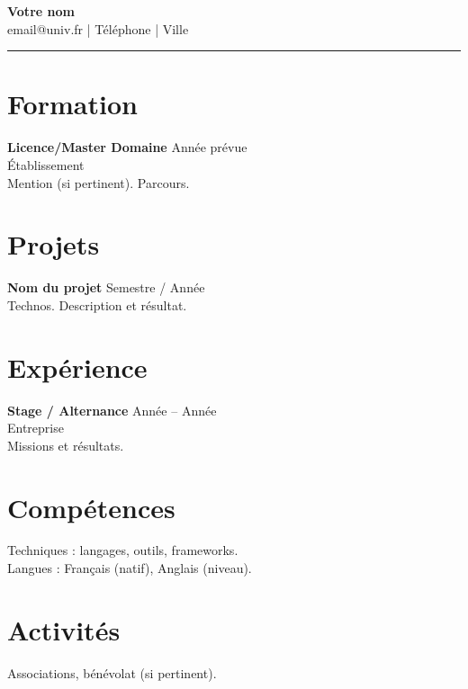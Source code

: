 \documentclass[11pt,a4paper]{article}
\begin{document}
\begin{center}
{\LARGE \textbf{Votre nom}}\\[0.2em]
email@univ.fr \quad | \quad Téléphone \quad | \quad Ville
\end{center}
\begin{flushright}\rule{2cm}{2.5cm}\end{flushright}
\vspace{0.4em}
\section*{Formation}
\textbf{Licence/Master Domaine} \hfill Année prévue \\
Établissement \\
Mention (si pertinent). Parcours.

\section*{Projets}
\textbf{Nom du projet} \hfill Semestre / Année \\
Technos. Description et résultat.

\section*{Expérience}
\textbf{Stage / Alternance} \hfill Année -- Année \\
Entreprise \\
Missions et résultats.

\section*{Compétences}
Techniques : langages, outils, frameworks. \\
Langues : Français (natif), Anglais (niveau).

\section*{Activités}
Associations, bénévolat (si pertinent).
\end{document}
